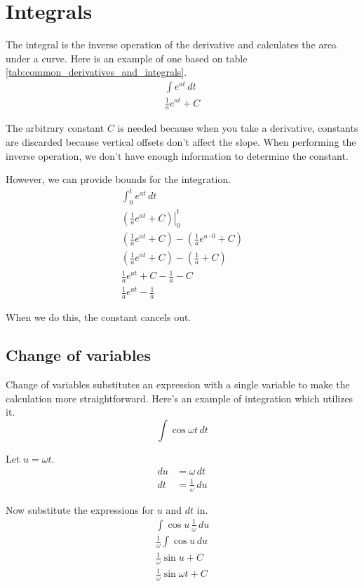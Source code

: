 \section{Integrals}

The integral is the inverse operation of the derivative and calculates the area
under a curve. Here is an example of one based on table
\ref{tab:common_derivatives_and_integrals}.
\begin{align*}
  \int e^{at} \,dt \\
  \frac{1}{a}e^{at} + C
\end{align*}

The arbitrary constant $C$ is needed because when you take a derivative,
constants are discarded because vertical offsets don't affect the slope. When
performing the inverse operation, we don't have enough information to determine
the constant.

However, we can provide bounds for the integration.
\begin{align*}
  \int_0^t e^{at} \,dt \\
  \left.\left(\frac{1}{a}e^{at} + C\right)\right\vert_0^t \\
  \left(\frac{1}{a}e^{at} + C\right) -
    \left(\frac{1}{a}e^{a \cdot 0} + C\right) \\
  \left(\frac{1}{a}e^{at} + C\right) - \left(\frac{1}{a} + C\right) \\
  \frac{1}{a}e^{at} + C - \frac{1}{a} - C \\
  \frac{1}{a}e^{at} - \frac{1}{a}
\end{align*}

When we do this, the constant cancels out.

\subsection{Change of variables}
\label{subsec:calculus_change_of_vars}

Change of variables substitutes an expression with a single variable to make the
calculation more straightforward. Here's an example of integration which
utilizes it.
\begin{equation*}
  \int \cos\omega t \,dt
\end{equation*}

Let $u = \omega t$.
\begin{align*}
  du &= \omega \,dt \\
  dt &= \frac{1}{\omega} \,du
\end{align*}

Now substitute the expressions for $u$ and $dt$ in.
\begin{align*}
  \int \cos u \,\frac{1}{\omega} \,du \\
  \frac{1}{\omega} \int \cos u \,du \\
  \frac{1}{\omega} \sin u + C \\
  \frac{1}{\omega} \sin\omega t + C
\end{align*}
